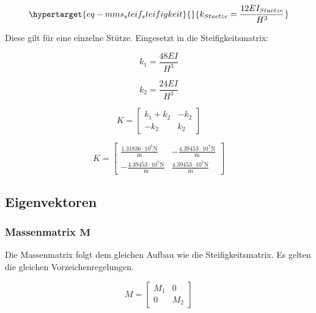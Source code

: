 \documentclass[
  letterpaper,
  DIV=11]{scrreprt}
\begin{document}
\begin{equation}\protect\hypertarget{eq-mms_steif_steifigkeit}{}{
k_{Stuetze} = \frac{12EI_{Stuetze}}{H^3}
}\label{eq-mms_steif_steifigkeit}\end{equation}

Diese gilt für eine einzelne Stütze. Eingesetzt in die
Steifigkeitsmatrix:

\begin{equation}k_{1} = \frac{48 E I}{H^{3}}\end{equation}

\begin{equation}k_{2} = \frac{24 E I}{H^{3}}\end{equation}

\begin{equation}K = \left[\begin{matrix}k_{1} + k_{2} & - k_{2}\\- k_{2} & k_{2}\end{matrix}\right]\end{equation}

\begin{equation}K = \left[\begin{matrix}\frac{1.31836 \cdot 10^{8} \text{N}}{\text{m}} & - \frac{4.39453 \cdot 10^{7} \text{N}}{\text{m}}\\- \frac{4.39453 \cdot 10^{7} \text{N}}{\text{m}} & \frac{4.39453 \cdot 10^{7} \text{N}}{\text{m}}\end{matrix}\right]\end{equation}

\hypertarget{eigenvektoren}{%
\subsection{Eigenvektoren}\label{eigenvektoren}}

\hypertarget{massenmatrix-mathbfm}{%
\subsubsection{\texorpdfstring{Massenmatrix
\(\mathbf{M}\)}{Massenmatrix \textbackslash mathbf\{M\}}}\label{massenmatrix-mathbfm}}

Die Massenmatrix folgt dem gleichen Aufbau wie die Steifigkeitsmatrix.
Es gelten die gleichen Vorzeichenregelungen.

\begin{equation}M = \left[\begin{matrix}M_{1} & 0\\0 & M_{2}\end{matrix}\right]\end{equation}
\end{document}
